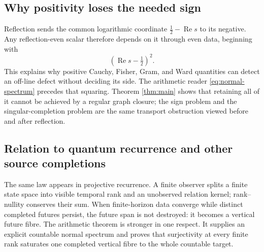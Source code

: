 \documentclass[11pt]{article}
\theoremstyle{definition}
\theoremstyle{remark}
\newcommand{\Rea}{\operatorname{Re}}
\begin{document}
\subsection{Why positivity loses the needed sign}

Reflection sends the common logarithmic coordinate
\(\tfrac12-\Rea s\) to its negative.  Any reflection-even scalar therefore
depends on it through even data, beginning with
\[
                         (\Rea s-\tfrac12)^2.
\tag{6.3}\label{eq:even-shadow}
\]
This explains why positive Cauchy, Fisher, Gram, and Ward quantities can
detect an off-line defect without deciding its side.  The arithmetic reader
\eqref{eq:normal-spectrum} precedes that squaring.  Theorem
\ref{thm:main} shows that retaining all of it cannot be achieved by a
regular graph closure; the sign problem and the singular-completion problem
are the same transport obstruction viewed before and after reflection.

\subsection{Relation to quantum recurrence and other source completions}

The same law appears in projective recurrence.  A finite observer splits a
finite state space into visible temporal rank and an unobserved relation
kernel; rank--nullity conserves their sum.  When finite-horizon data converge
while distinct completed futures persist, the future span is not destroyed:
it becomes a vertical future fibre.  The arithmetic theorem is stronger in
one respect.  It supplies an explicit countable normal spectrum and proves
that surjectivity at every finite rank saturates one completed vertical fibre
to the whole countable target.
\end{document}
